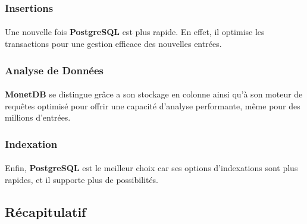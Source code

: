 \documentclass[11pt]{extarticle}
\begin{document}
\subsubsection{Insertions}
\paragraph{}
Une nouvelle fois \textbf{PostgreSQL} est plus rapide. En effet, il optimise les transactions pour une gestion efficace des nouvelles entrées.


\subsubsection{Analyse de Données}
\paragraph{}
\textbf{MonetDB} se distingue grâce a son stockage en colonne ainsi qu'à son moteur de requêtes optimisé pour offrir une capacité d'analyse performante, même pour des millions d'entrées.

\subsubsection{Indexation}
\paragraph{}
Enfin, \textbf{PostgreSQL} est le meilleur choix car ses options d'indexations sont plus rapides, et il supporte plus de possibilités.

\subsection{Récapitulatif}
\end{document}
